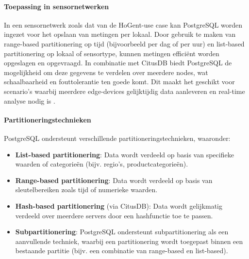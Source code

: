 \paragraph{Toepassing in sensornetwerken}  
In een sensornetwerk zoals dat van de HoGent-use case kan PostgreSQL worden ingezet voor het opslaan van metingen per lokaal. Door gebruik te maken van range-based partitionering op tijd (bijvoorbeeld per dag of per uur) en list-based partitionering op lokaal of sensortype, kunnen metingen efficiënt worden opgeslagen en opgevraagd. In combinatie met CitusDB biedt PostgreSQL de mogelijkheid om deze gegevens te verdelen over meerdere nodes, wat schaalbaarheid en fouttolerantie ten goede komt. Dit maakt het geschikt voor scenario’s waarbij meerdere edge-devices gelijktijdig data aanleveren en real-time analyse nodig is \autocite{PostgreSQLDocumentation, Kleppmann2017}.

\paragraph{Partitioneringstechnieken}  
PostgreSQL ondersteunt verschillende partitioneringstechnieken, waaronder:
\begin{itemize}
    \item \textbf{List-based partitionering}: Data wordt verdeeld op basis van specifieke waarden of categorieën (bijv. regio's, productcategorieën).
    \item \textbf{Range-based partitionering}: Data wordt verdeeld op basis van sleutelbereiken zoals tijd of numerieke waarden.
    \item \textbf{Hash-based partitionering} (via CitusDB): Data wordt gelijkmatig verdeeld over meerdere servers door een hashfunctie toe te passen.
    \item \textbf{Subpartitionering}: PostgreSQL ondersteunt subpartitionering als een aanvullende techniek, waarbij een partitionering wordt toegepast binnen een bestaande partitie (bijv. een combinatie van range-based en list-based).
\end{itemize}

